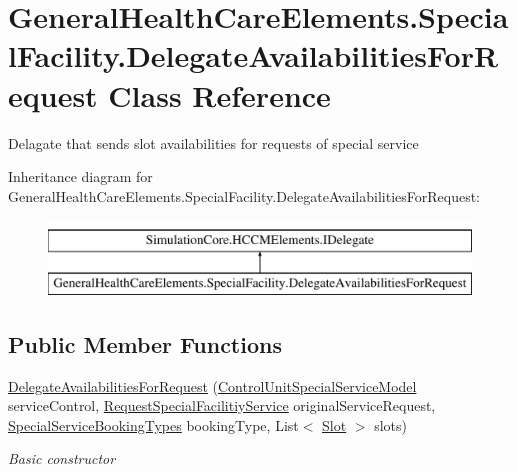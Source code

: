\hypertarget{class_general_health_care_elements_1_1_special_facility_1_1_delegate_availabilities_for_request}{}\section{General\+Health\+Care\+Elements.\+Special\+Facility.\+Delegate\+Availabilities\+For\+Request Class Reference}
\label{class_general_health_care_elements_1_1_special_facility_1_1_delegate_availabilities_for_request}


Delagate that sends slot availabilities for requests of special service  


Inheritance diagram for General\+Health\+Care\+Elements.\+Special\+Facility.\+Delegate\+Availabilities\+For\+Request\+:\begin{figure}[H]
\begin{center}
\leavevmode
\includegraphics[height=2.000000cm]{class_general_health_care_elements_1_1_special_facility_1_1_delegate_availabilities_for_request}
\end{center}
\end{figure}
\subsection*{Public Member Functions}
\begin{DoxyCompactItemize}
\item 
\hyperlink{class_general_health_care_elements_1_1_special_facility_1_1_delegate_availabilities_for_request_aa7ab34f23a9495d84af13b153f8eeb6f}{Delegate\+Availabilities\+For\+Request} (\hyperlink{class_general_health_care_elements_1_1_special_facility_1_1_control_unit_special_service_model}{Control\+Unit\+Special\+Service\+Model} service\+Control, \hyperlink{class_general_health_care_elements_1_1_special_facility_1_1_request_special_facilitiy_service}{Request\+Special\+Facilitiy\+Service} original\+Service\+Request, \hyperlink{namespace_enums_a983d5bd1d6201551a5cc9c34c53d1af6}{Special\+Service\+Booking\+Types} booking\+Type, List$<$ \hyperlink{class_general_health_care_elements_1_1_booking_models_1_1_slot}{Slot} $>$ slots)
\begin{DoxyCompactList}\small\item\em Basic constructor \end{DoxyCompactList}\end{DoxyCompactItemize}
